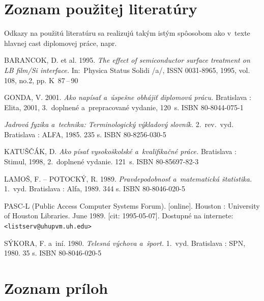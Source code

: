 \documentclass[a4paper]{feidipsp}
\begin{document}
\section{Zoznam použitej literatúry}

Odkazy na použitú literatúru sa realizujú takým istým spôosobom ako v~texte hlavnej cast diplomovej práce, napr.

\def\refname{Zoznam použitej literatúry}

\begin{thebibliography}{999}
BARANCOK, D. et al. 1995. \emph{The effect of semiconductor surface treatment on LB film/Si interface.} In:~Physica Status Solidi /a/,  ISSN 0031-8965, 1995, vol. 108, no.2, pp. K~87\,--\,90

GONDA, V. 2001. \emph{Ako napísať a~úspešne obhájiť diplomovú prácu.} Bratislava : Elita, 2001, 3.~doplnené a~prepracované vydanie, 120~s. ISBN 80-8044-075-1

\emph{Jadrová fyzika a~technika: Terminologický výkladový slovník.} 2.~rev.~vyd. Bratislava : ALFA, 1985. 235 s. ISBN 80-8256-030-5

KATUŠČÁK, D. \emph{Ako písať vysokoškolské a~kvalifikačné práce.} Bratislava : Stimul, 1998, 2.~doplnené vydanie. 121~s. ISBN 80-85697-82-3


LAMOŠ, F. -- POTOCKÝ, R. 1989. \emph{Pravdepodobnosť a~matematická štatistika.} 1.~vyd. Bratislava : Alfa, 1989. 344 s. ISBN 80-8046-020-5

 PASC-L (Public Access Computer Systems Forum). [online]. Houston : University of Houston Libraries. June 1989. [cit: 1995-05-07]. Dostupné na internete: \verb+<listserv@uhupvm.uh.edu>+

SÝKORA, F. a~iní. 1980. \emph{Telesná výchova a~šport.} 1.~vyd. Bratislava : SPN, 1980. 35 s. ISBN 80-8046-020-5


\end{thebibliography}



\section{Zoznam príloh}
\end{document}
